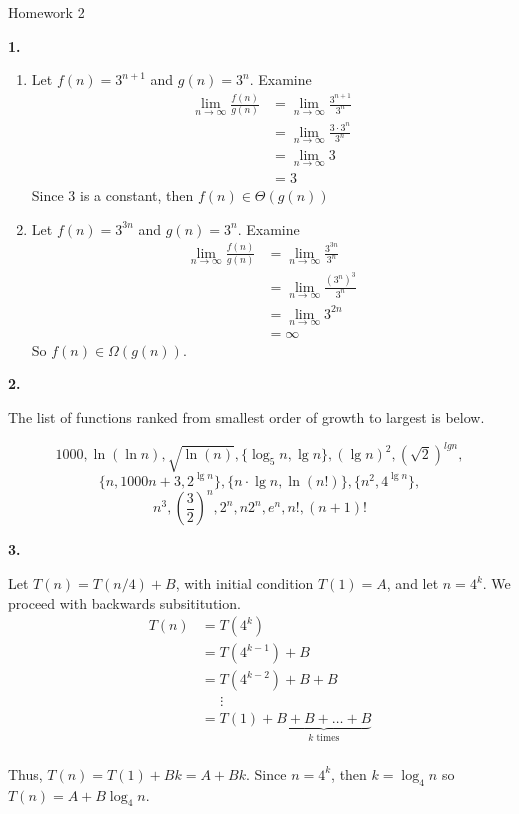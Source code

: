 \documentclass[letterpaper, 11pt]{article}
\newcommand{\hwnumber}[1]{\medskip \noindent\textbf{#1.} \smallskip}
\begin{document}
\begin{center}
	{\LARGE Homework 2}\\
\end{center}

\hwnumber{1} 

\begin{enumerate}[label = (\alph*)]
  \item Let \(f(n) = 3^{n + 1}\) and \(g(n) = 3^n\). Examine
   \begin{align*}
     \lim_{n \to \infty} \frac{f(n)}{g(n)} &= \lim_{n \to
                                                   \infty}\frac{3^{n+1}}{3^n}\\
                                           &= \lim_{n \to \infty} \frac{3 \cdot
                                           3^n}{3^n}\\
                                           &= \lim_{n \to \infty} 3\\
                                           &= 3
   \end{align*}
   Since 3 is a constant, then \(f(n) \in \Theta(g(n))\)

 \item Let \(f(n) = 3^{3n}\) and \(g(n) = 3^n\). Examine
   \begin{align*}
     \lim_{n \to \infty} \frac{f(n)}{g(n)} &= \lim_{n \to \infty}
                                                     \frac{3^{3n}}{3^n}\\
                                           &= \lim_{n \to
                                           \infty}\frac{(3^n)^3}{3^n} \\
                                           &= \lim_{n \to \infty} 3^{2n} \\
                                           &= \infty
    \end{align*}
    So \(f(n) \in \Omega(g(n))\).
\end{enumerate}

\hwnumber{2}

\noindent The list of functions ranked from smallest order of growth to largest is below.

\[1000, \ln(\ln n), \sqrt{\ln(n)}, \{\log_5 n, \lg n\}, (\lg n)^2,
\left(\sqrt{2}\right)^{lg n},\]
\[\{n, 1000n+3, 2^{\lg n}\}, \{n\cdot\lg n, \ln(n!)\}, \{n^2, 4^{\lg n}\},\]
\[n^3, \left(\frac{3}{2}\right)^n, 2^n, n2^n, e^n, n!, (n + 1)!\]

\newpage
\hwnumber{3}

Let \(T(n) = T(n/4) + B\), with initial condition \(T(1) = A\), and let \(n =
4^k\). We proceed with backwards subsititution. 
\begin{align*}
  T(n) &= T(4^k)\\
       &= T(4^{k - 1}) + B\\
       &= T(4^{k - 2}) + B + B\\
       &\;\;\;\;\;\vdots \\
       &= T(1) + \underbrace{B + B + \dots + B}_{k \text{ times}}\\
\end{align*}

Thus, \(T(n) = T(1) + Bk = A + Bk\). Since \(n = 4^k\), then \(k = \log_4 n\)
so \(T(n) = A + B\log_4 n\).
\end{document}
